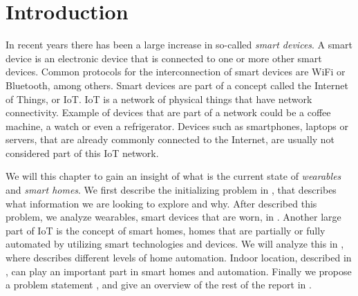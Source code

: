 \chapter{Introduction}\label{chap:introduction}
In recent years there has been a large increase in so-called \emph{smart devices}. 
A smart device is an electronic device that is connected to one or more other smart devices. 
Common protocols for the interconnection of smart devices are WiFi or Bluetooth, among others.
Smart devices are part of a concept called the Internet of Things, or IoT. 
IoT is a network of physical things that have network connectivity. 
Example of devices that are part of a network could be a coffee machine, a watch or even a refrigerator. 
Devices such as smartphones, laptops or servers, that are already commonly connected to the Internet, are usually not considered part of this IoT network. 

We will this chapter to gain an insight of what is the current state of \emph{wearables} and \emph{smart homes}. 
We first describe the initializing problem in , 
that describes what information we are looking to explore and why. 
After described this problem, we analyze wearables, \ie smart devices that are worn, in .
Another large part of IoT is the concept of smart homes, 
\ie homes that are partially or fully automated by utilizing smart technologies and devices. 
We will analyze this in , 
where  describes different levels of home automation. 
Indoor location, described in , 
can play an important part in smart homes and automation.
Finally we propose a problem statement , 
and give an overview of the rest of the report in .









